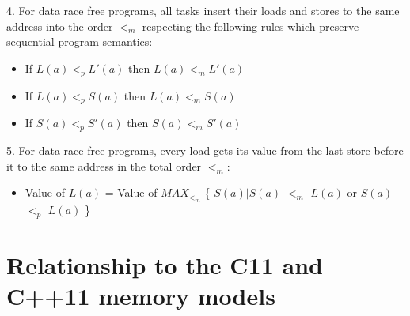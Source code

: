 4. For data race free programs, all tasks insert their loads and stores to the
same address into the order $<_m$ respecting the following rules which preserve
sequential program semantics:

\begin{itemize}
  \item If $L(a) <_p L'(a)$ then $L(a) <_m L'(a)$
  \item If $L(a) <_p S(a)$ then $L(a) <_m S(a)$
  \item If $S(a) <_p S'(a)$ then $S(a) <_m S'(a)$
\end{itemize}

5. For data race free programs, every load gets its value from the last store before it to the same address in the total order $<_m$:
\begin{itemize}
  \item Value of $L(a)$ = Value of $MAX_{<_m}$ \{ $S(a)|S(a)$ $<_m$ $L(a)$ or $S(a)$ $<_p$ $L(a)$ \}
\end{itemize}

%
%
%
% 

\section{Relationship to the C11 and C++11 memory models}
\label{relating_to_C_MCM}

